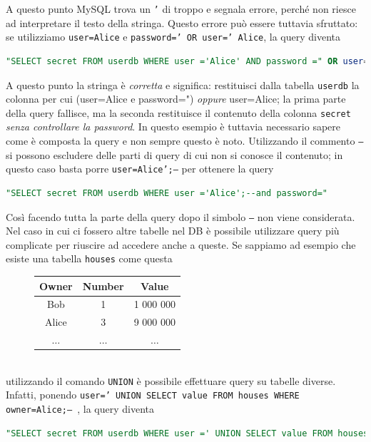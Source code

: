 A questo punto MySQL trova un \texttt{'} di troppo e segnala errore, perché non riesce ad interpretare il testo della stringa. Questo errore può essere tuttavia sfruttato: se utilizziamo \texttt{user=Alice} e \texttt{password=' OR user=' Alice}, la query diventa
\begin{lstlisting}[language=sql]
"SELECT secret FROM userdb WHERE user ='Alice' AND password =" OR user='Alice'
\end{lstlisting}
A questo punto la stringa è \textit{corretta} e significa: restituisci dalla tabella \texttt{userdb} la colonna per cui (user=Alice e password=") \textit{oppure} user=Alice; la prima parte della query fallisce, ma la seconda restituisce il contenuto della colonna \texttt{secret} \textit{senza controllare la password}. In questo esempio è tuttavia necessario sapere come è composta la query e non sempre questo è noto. Utilizzando il commento \texttt{--} si possono escludere delle parti di query di cui non si conosce il contenuto; in questo caso basta porre \texttt{user=Alice';--} per ottenere la query
\begin{lstlisting}[language=sql]
"SELECT secret FROM userdb WHERE user ='Alice';--and password="
\end{lstlisting}
Così facendo tutta la parte della query dopo il simbolo \texttt{--} non viene considerata. Nel caso in cui ci fossero altre tabelle nel DB è possibile utilizzare query più complicate per riuscire ad accedere anche a queste. Se sappiamo ad esempio che esiste una tabella \texttt{houses} come questa
\begin{figure}[htbp]
	\centering
	\begin{tabular}{|c|c|c|}
		\hline
		\textbf{Owner} & \textbf{Number} & \textbf{Value} \\
		\hline
		Bob & 1 & 1 000 000 \\
		\hline
		Alice & 3 & 9 000 000 \\
		\hline
		$\dots$ & $\dots$ & $\dots$ \\
		\hline
	\end{tabular}
\end{figure}\\
utilizzando il comando \texttt{UNION} è possibile effettuare query su tabelle diverse. Infatti, ponendo \texttt{user=' UNION SELECT value FROM houses WHERE owner=Alice;-- }, la query diventa
\begin{lstlisting}[language=sql,basicstyle=\scriptsize\ttfamily]
"SELECT secret FROM userdb WHERE user =' UNION SELECT value FROM houses WHERE owner=Alice;-- "
\end{lstlisting}
